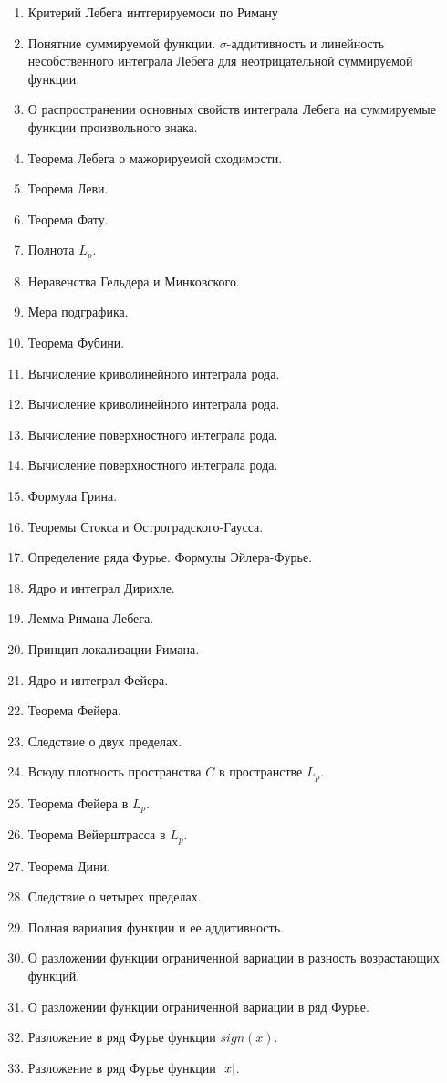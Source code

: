\documentclass{article}
\begin{document}
\begin{enumerate}
	\item Критерий Лебега интгерируемоси по Риману
	\item Понятние суммируемой функции. $\sigma$-аддитивность и линейность несобственного интеграла Лебега для неотрицательной суммируемой функции.
	\item О распространении основных свойств интеграла Лебега на суммируемые функции произвольного знака.
	\item Теорема Лебега о мажорируемой сходимости.
	\item Теорема Леви.
	\item Теорема Фату.
	\item Полнота $L_p$.
	\item Неравенства Гельдера и Минковского.
	\item Мера подграфика.
	\item Теорема Фубини.
	\item Вычисление криволинейного интеграла  рода.
	\item Вычисление криволинейного интеграла  рода.
	\item Вычисление поверхностного интеграла  рода.
	\item Вычисление поверхностного интеграла  рода.
	\item Формула Грина.
	\item Теоремы Стокса и Остроградского-Гаусса.
	\item Определение ряда Фурье. Формулы Эйлера-Фурье.
	\item Ядро и интеграл Дирихле.
	\item Лемма Римана-Лебега.
	\item Принцип локализации Римана.
	\item Ядро и интеграл Фейера.
	\item Теорема Фейера.
	\item Следствие о двух пределах.
	\item Всюду плотность пространства $C$ в пространстве $L_p$.
	\item Теорема Фейера в $L_p$.
	\item Теорема Вейерштрасса в $L_p$.
	\item Теорема Дини.
	\item Следствие о четырех пределах.
	\item Полная вариация функции и ее аддитивность.
	\item О разложении функции ограниченной вариации в разность возрастающих функций.
	\item О разложении функции ограниченной вариации в ряд Фурье.
	\item Разложение в ряд Фурье функции $sign(x)$.
	\item Разложение в ряд Фурье функции $\left|x\right|$.
\end{enumerate}
\end{document}
